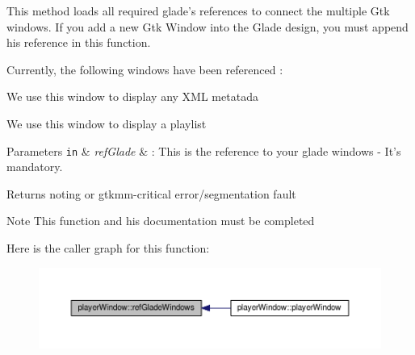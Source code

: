 This method loads all required glade's references to connect the multiple Gtk windows. If you add a new Gtk Window into the Glade design, you must append his reference in this function.\par
 \par
 Currently, the following windows have been referenced \-:\par
 \begin{DoxyItemize}
\item { We} use this window to display any X\-M\-L metatada \item { We} use this window to display a playlist\par
 \par
 
\begin{DoxyParams}[1]{Parameters}
\mbox{\tt in}  & {\em ref\-Glade} & \-: This is the reference to your glade windows -\/ It's mandatory. \\
\hline
\end{DoxyParams}
\begin{DoxyReturn}{Returns}
noting or gtkmm-\/critical error/segmentation fault 
\end{DoxyReturn}
\begin{DoxyNote}{Note}
This function and his documentation must be completed 
\end{DoxyNote}
\end{DoxyItemize}


Here is the caller graph for this function\-:\nopagebreak
\begin{figure}[H]
\begin{center}
\leavevmode
\includegraphics[width=350pt]{classplayerWindow_a5522bc90b88998851e87d364fe081b80_icgraph}
\end{center}
\end{figure}




